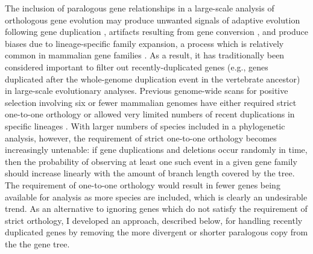 The inclusion of paralogous gene relationships in a large-scale
analysis of orthologous gene evolution may produce unwanted signals of
adaptive evolution following gene duplication \citep{Lynch2000},
artifacts resulting from gene conversion \citep{Casola2009}, and
produce biases due to lineage-specific family expansion, a process
which is relatively common in mammalian gene families
\citep{Gu2002}. As a result, it has traditionally been considered
important to filter out recently-duplicated genes (e.g., genes
duplicated after the whole-genome duplication event in the vertebrate
ancestor) in large-scale evolutionary analyses. Previous genome-wide
scans for positive selection involving six or fewer mammalian genomes
have either required strict one-to-one orthology
\citep{Clark2003,Nielsen2005} or allowed very limited numbers of
recent duplications in specific lineages \citep{Kosiol2008}. With
larger numbers of species included in a phylogenetic analysis,
however, the requirement of strict one-to-one orthology becomes
increasingly untenable: if gene duplications and deletions occur
randomly in time, then the probability of observing at least one such
event in a given gene family should increase linearly with the amount
of branch length covered by the tree. The requirement of one-to-one
orthology would result in fewer genes being available for analysis as
more species are included, which is clearly an undesirable trend. As
an alternative to ignoring genes which do not satisfy the requirement
of strict orthology, I developed an approach, described below, for
handling recently duplicated genes by removing the more divergent or
shorter paralogous copy from the the gene tree.

